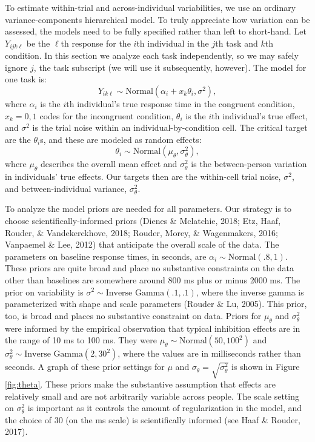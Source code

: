 \documentclass[
  english,
  ,man]{apa6}
\begin{document}
To estimate within-trial and across-individual variabilities, we use an ordinary variance-components hierarchical model. To truly appreciate how variation can be assessed, the models need to be fully specified rather than left to short-hand. Let \(Y_{ijk\ell}\) be the \(\ell\)th response for the \(i\)th individual in the \(j\)th task and \(k\)th condition. In this section we analyze each task independently, so we may safely ignore \(j\), the task subscript (we will use it subsequently, however). The model for one task is:
\[
Y_{ik\ell} \sim \mbox{Normal}(\alpha_i+x_k\theta_i,\sigma^2),
\]
where \(\alpha_i\) is the \(i\)th individual's true response time in the congruent condition, \(x_k=0,1\) codes for the incongruent condition, \(\theta_i\) is the \(i\)th individual's true effect, and \(\sigma^2\) is the trial noise within an individual-by-condition cell. The critical target are the \(\theta_i\)s, and these are modeled as random effects:
\[
\theta_i \sim \mbox{Normal}(\mu_\theta,\sigma^2_\theta),
\]
where \(\mu_\theta\) describes the overall mean effect and \(\sigma^2_\theta\) is the between-person variation in individuals' true effects. Our targets then are the within-cell trial noise, \(\sigma^2\), and between-individual variance, \(\sigma^2_\theta\).

To analyze the model priors are needed for all parameters. Our strategy is to choose scientifically-informed priors (Dienes \& Mclatchie, 2018; Etz, Haaf, Rouder, \& Vandekerckhove, 2018; Rouder, Morey, \& Wagenmakers, 2016; Vanpaemel \& Lee, 2012) that anticipate the overall scale of the data. The parameters on baseline response times, in seconds, are \(\alpha_i \sim \mbox{Normal}(.8,1)\). These priors are quite broad and place no substantive constraints on the data other than baselines are somewhere around 800 ms plus or minus 2000 ms. The prior on variability is \(\sigma^2 \sim \mbox{Inverse Gamma}(.1,.1)\), where the inverse gamma is parameterized with shape and scale parameters (Rouder \& Lu, 2005). This prior, too, is broad and places no substantive constraint on data. Priors for \(\mu_\theta\) and \(\sigma^2_\theta\) were informed by the empirical observation that typical inhibition effects are in the range of 10 ms to 100 ms. They were \(\mu_\theta \sim \mbox{Normal}(50, 100^2 )\) and \(\sigma^2_\theta \sim \mbox{Inverse Gamma}(2,30^2)\), where the values are in milliseconds rather than seconds. A graph of these prior settings for \(\mu\) and \(\sigma_\theta=\sqrt{\sigma^2_\theta}\) is shown in Figure \ref{fig:theta}. These priors make the substantive assumption that effects are relatively small and are not arbitrarily variable across people. The scale setting on \(\sigma^2_\theta\) is important as it controls the amount of regularization in the model, and the choice of 30 (on the ms scale) is scientifically informed (see Haaf \& Rouder, 2017).
\end{document}
